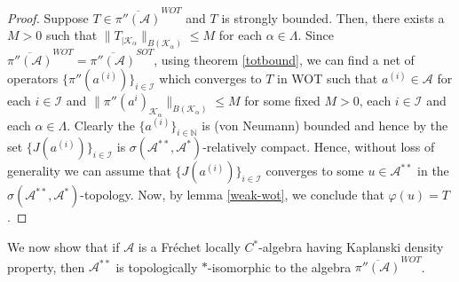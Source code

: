 \documentclass[10pt]{article}
\theoremstyle{definition}
\begin{document}
\begin{proof}
	Suppose $T\in \overline{\pi''(\mathcal A)}^{WOT}$ and $T$ is strongly bounded. Then, there exists a $M>0$ such that $\|T_{|\mathcal K_\alpha}\|_{B(\mathcal K_\alpha)}\leq M$ for each $\alpha\in \Lambda$. Since $\overline{\pi''(\mathcal A)}^{WOT}=\overline{\pi''(\mathcal A)}^{SOT}$, using theorem \ref{totbound}, we can find a net of operators $\{\pi''(a^{(i)})\}_{i\in \mathcal I}$ which converges to $T$ in WOT such that $a^{(i)}\in \mathcal A$ for each $i\in \mathcal I$ and $\|\pi''(a^{{i}})_{\mathcal K_\alpha}\|_{B(\mathcal K_\alpha)}\leq M$ for some fixed $M>0$, each $i\in \mathcal I$ and each $\alpha\in \Lambda$. Clearly the $\{a^{(i)}\}_{i\in \mathbb N}$ is (von Neumann) bounded and hence by \cite[23.2.4,p298]{Kothe} the set $\{J(a^{(i)})\}_{i\in \mathcal I}$ is $\sigma(\mathcal A^{**},\mathcal A^{*})$-relatively compact. Hence, without loss of generality we can assume that $\{J(a^{(i)})\}_{i\in \mathcal I}$ converges to some $u\in \mathcal A^{**}$ in the $\sigma(\mathcal A^{**},\mathcal A^{*})$-topology. Now, by lemma \ref{weak-wot}, we conclude that $\varphi(u)=T$.
\end{proof}

We now show that if $\mathcal A$ is a Fr\'echet locally $C^*$-algebra having Kaplanski density property, then $\mathcal A^{**}$ is topologically $*$-isomorphic to the algebra $\overline{\pi''(\mathcal A)}^{WOT}$.
\end{document}
